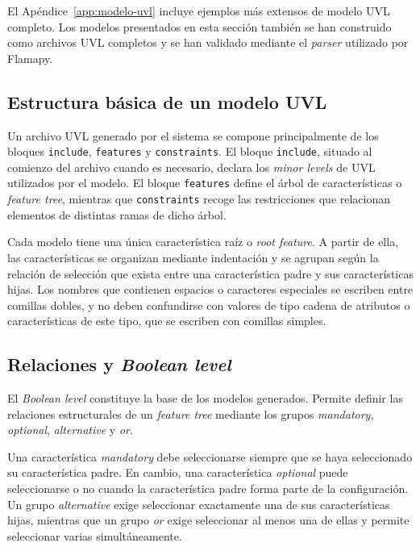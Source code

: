 El Apéndice~\ref{app:modelo-uvl} incluye ejemplos más extensos de modelo UVL
completo. Los modelos presentados en esta sección también se han construido
como archivos UVL completos y se han validado mediante el \textit{parser}
utilizado por Flamapy.

\subsection{Estructura básica de un modelo UVL}
\label{subsec:estructura_basica}

Un archivo UVL generado por el sistema se compone principalmente de los
bloques \texttt{include}, \texttt{features} y \texttt{constraints}. El bloque
\texttt{include}, situado al comienzo del archivo cuando es necesario, declara
los \textit{minor levels} de UVL utilizados por el modelo. El bloque
\texttt{features} define el árbol de características o \textit{feature tree},
mientras que \texttt{constraints} recoge las restricciones que relacionan
elementos de distintas ramas de dicho árbol.

Cada modelo tiene una única característica raíz o \textit{root feature}. A
partir de ella, las características se organizan mediante indentación y se
agrupan según la relación de selección que exista entre una característica
padre y sus características hijas. Los nombres que contienen espacios o
caracteres especiales se escriben entre comillas dobles, y no deben confundirse con valores de tipo cadena de atributos o características de este tipo, que se escriben con comillas simples.

\subsection{Relaciones y \textit{Boolean level}}
\label{subsec:diseño_lenguaje}

El \textit{Boolean level} constituye la base de los modelos generados. Permite
definir las relaciones estructurales de un \textit{feature tree} mediante los
grupos \textit{mandatory}, \textit{optional}, \textit{alternative} y
\textit{or}.

Una característica \textit{mandatory} debe seleccionarse siempre que se haya
seleccionado su característica padre. En cambio, una característica
\textit{optional} puede seleccionarse o no cuando la característica padre
forma parte de la configuración. Un grupo \textit{alternative} exige
seleccionar exactamente una de sus características hijas, mientras que un
grupo \textit{or} exige seleccionar al menos una de ellas y permite seleccionar
varias simultáneamente.

